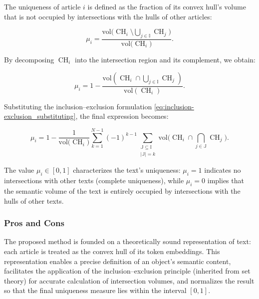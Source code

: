 The uniqueness of article $i$ is defined as the fraction of its convex hull’s volume that is not occupied by intersections with the hulls of other articles:

\begin{equation}
    \mu_i = \frac{\mathrm{vol}\Big( \operatorname{CH}_i \setminus \bigcup_{j \in \mathbb{I}} \operatorname{CH}_j\Big)}{\mathrm{vol}\Big( \operatorname{CH}_i\Big)}.
\end{equation}

By decomposing $\operatorname{CH}_i$ into the intersection region and its complement, we obtain:

\begin{equation}
    \mu_i = 1 - \frac{\mathrm{vol}\left(\operatorname{CH}_i \cap \bigcup_{j \in \mathbb{I}}\operatorname{CH}_j\right)}{\mathrm{vol}\left(\operatorname{CH}_i\right)}.
\end{equation}

Substituting the inclusion--exclusion formulation \ref{eq:inclusion-exclusion_substituting}, the final expression becomes:

\begin{equation}\label{eq:uniqueness}
    \mu_i = 1 - \frac{1}{\mathrm{vol}\big(\operatorname{CH}_i\big)}
    \sum_{k=1}^{N-1} (-1)^{k-1} \sum_{\substack{\mathbb{J} \subseteq \mathbb{I} \\ |\mathbb{J}| = k}}
    \mathrm{vol}\Big(\operatorname{CH}_i \cap \bigcap_{j \in \mathbb{J}}\operatorname{CH}_j\Big).
\end{equation}

The value $\mu_i \in [0, 1]$ characterizes the text's uniqueness: $\mu_i = 1$ indicates no intersections with other texts (complete uniqueness),
while $\mu_i = 0$ implies that the semantic volume of the text is entirely occupied by intersections with the hulls of other texts.

\subsubsection{Pros and Cons}
The proposed method is founded on a theoretically sound representation of text: each article is treated as the convex hull of its token embeddings.
This representation enables a precise definition of an object’s semantic content, facilitates the application of the inclusion–exclusion principle
(inherited from set theory) for accurate calculation of intersection volumes, and normalizes the result so that the final uniqueness measure
lies within the interval $[0,1]$.

